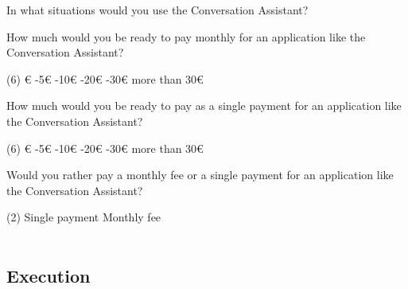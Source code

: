 \documentclass[english, 12pt, a4paper, pdftex, elec, utf8]{aaltothesis}
\begin{document}
{\begin{questionnaire}[resume]
        \item In what situations would you use the Conversation Assistant?
        \item How much would you be ready to pay monthly for an application like the Conversation Assistant?
        \begin{tasks}[label-width = 2em](6)
            €
            -5€
            -10€
            -20€
            -30€
            \task more than 30€
        \end{tasks}
        \item How much would you be ready to pay as a single payment for an application like the Conversation Assistant?
        \begin{tasks}[label-width = 2em](6)
            €
            -5€
            -10€
            -20€
            -30€
            \task more than 30€
        \end{tasks}
        \item Would you rather pay a monthly fee or a single payment for an application like the Conversation Assistant?
        \begin{tasks}[label-width = 2em](2)
            \task Single payment
            \task Monthly fee \\\\
        \end{tasks}
    \end{questionnaire}
}

\clearpage

\subsection{Execution} \label{sec:execution}
\end{document}
